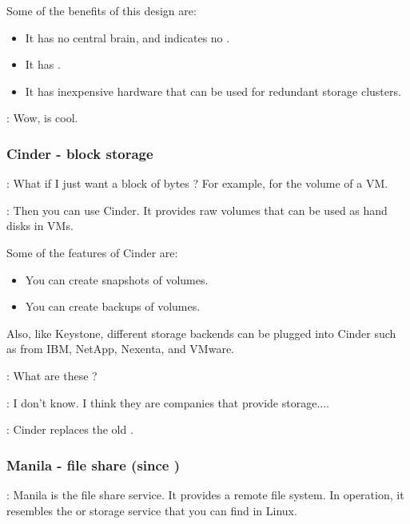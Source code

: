 \documentclass[dvipsnames]{article}
\begin{document}
Some of the benefits of this design are:

\begin{itemize}
\item It has no central brain, and indicates no .
\item It has .
\item It has inexpensive hardware that can be used for redundant storage clusters.
\end{itemize}

 : Wow,  is cool.

\subsubsection{Cinder - block storage}

 : What if I just want a block of bytes ? For example, for the
volume of a VM.

 : Then you can use Cinder. It provides raw volumes that can be
used as hand disks in VMs.

Some of the features of Cinder are:

\begin{itemize}
\item You can create snapshots of volumes.
\item You can create backups of volumes.
\end{itemize}

Also, like Keystone, different storage backends can be plugged into Cinder such
as from IBM, NetApp, Nexenta, and VMware.

 : What are these ?

 : I don't know. I think they are companies that provide
storage....

\begin{tcolorbox}
   : Cinder replaces the old . 
\end{tcolorbox}

\subsubsection{Manila - file share (since )}

 : Manila is the file share service. It provides a remote file
system. In operation, it resembles the  or
 storage service that you can find in Linux.
\end{document}
